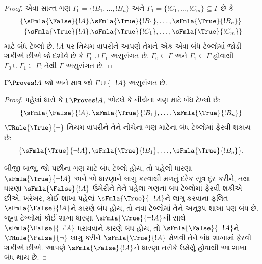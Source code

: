 \begin{proof}
એવા સાન્ત ગણ $\Gamma_0 = \{!B_1, \dots, !B_n\}$ અને $\Gamma_1
  =\{!C_1, \dots, !C_m\} \subseteq \Gamma$ છે કે
  \begin{align*}
    \{\sFmla{\False}{!A}, &
    \sFmla{\True}{!B_1}, \dots, \sFmla{\True}{!B_n}\} \\
    \{\sFmla{\True}{!A}, &
    \sFmla{\True}{!C_1}, \dots, \sFmla{\True}{!C_m}\}
  \end{align*}
  માટે બંધ ટેબ્લો છે. $!A$ પર \Cut{} નિયમ વાપરીને આપણે તેમને એક
  એવા બંધ ટેબ્લોમાં જોડી શકીએ છીએ જે દર્શાવે છે કે
  $\Gamma_0 \cup \Gamma_1$ અસુસંગત છે. $\Gamma_0 \subseteq \Gamma$ અને
  $\Gamma_1 \subseteq \Gamma$ હોવાથી $\Gamma_0 \cup \Gamma_1
  \subseteq \Gamma$; તેથી $\Gamma$ અસુસંગત છે.
\end{proof}

\begin{prop}
$\Gamma \Proves !A$ જો અને માત્ર જો $\Gamma \cup \{\lnot !A\}$
અસુસંગત છે.
\end{prop}

\begin{proof}
પહેલાં ધારો કે $\Gamma \Proves !A$, એટલે કે નીચેના ગણ માટે બંધ
ટેબ્લો છે:
\[
\{\sFmla{\False}{!A},
\sFmla{\True}{!B_1}, \dots, \sFmla{\True}{!B_n}\}
\]
$\TRule{\True}{\lnot}$ નિયમ વાપરીને તેને નીચેના ગણ માટેના બંધ
ટેબ્લોમાં ફેરવી શકાય છે:
\[
\{\sFmla{\True}{\lnot !A},
\sFmla{\True}{!B_1}, \dots, \sFmla{\True}{!B_n}\}.
\]

બીજી બાજુ, જો પછીના ગણ માટે બંધ ટેબ્લો હોય, તો પહેલી
ધારણા~$\sFmla{\True}{\lnot !A}$ અને એ ધારણાને
\TRule{\True}{\lnot} લાગુ કરવાથી મળતું દરેક સૂત્ર દૂર કરીને, તથા ધારણા
$\sFmla{\False}{!A}$ ઉમેરીને તેને પહેલા ગણના બંધ ટેબ્લોમાં ફેરવી
શકીએ છીએ. ખરેખર, કોઈ શાખા પહેલાં $\sFmla{\True}{\lnot !A}$ને
\TRule{\True}{\lnot} લાગુ કરવાના ફલિત $\sFmla{\False}{!A}$ને કારણે બંધ
હોય, તો નવા ટેબ્લોમાં તેને અનુરૂપ શાખા પણ બંધ છે. જૂના ટેબ્લોમાં
કોઈ શાખા ધારણા $\sFmla{\True}{\lnot !A}$ની સાથે
$\sFmla{\False}{\lnot !A}$ ધરાવવાને કારણે બંધ હોય, તો
$\sFmla{\False}{\lnot !A}$ને $\TRule{\False}{\lnot}$ લાગુ કરીને
$\sFmla{\True}{!A}$ મેળવી તેને બંધ શાખામાં ફેરવી શકીએ છીએ. આપણે
$\sFmla{\False}{!A}$ને ધારણા તરીકે ઉમેર્યું હોવાથી આ શાખા બંધ થાય છે.
\end{proof}

